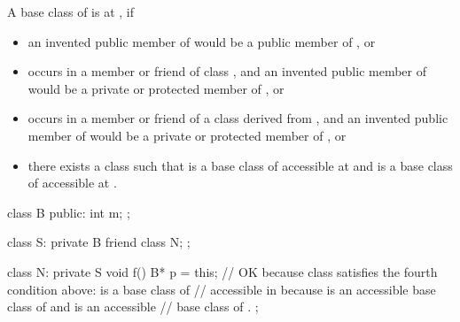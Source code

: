 \pnum
A base class
of
is
at
,
if
\begin{itemize}
\item
an invented public member of
would be a public member of
, or
\item
{}
occurs in a member or friend of class
,
and an invented public member of
would be a private or protected member of
, or
\item
{}
occurs in a member or friend of a class
derived from
,
and an invented public member of
would be a private or protected member of
, or
\item
there exists a class
such that
is a base class of
accessible at
and
is a base class of
accessible at
.
\end{itemize}

\begin{example}
\begin{codeblock}
class B {
public:
  int m;
};

class S: private B {
  friend class N;
};

class N: private S {
  void f() {
    B* p = this;    // OK because class  satisfies the fourth condition above:  is a base class of 
                    // accessible in  because  is an accessible base class of  and  is an accessible
                    // base class of .
  }
};
\end{codeblock}
\end{example}

